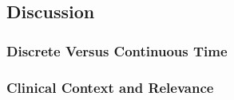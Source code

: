 \subsection{Discussion}
\subsubsection{Discrete Versus Continuous Time}

\subsubsection{Clinical Context and Relevance}